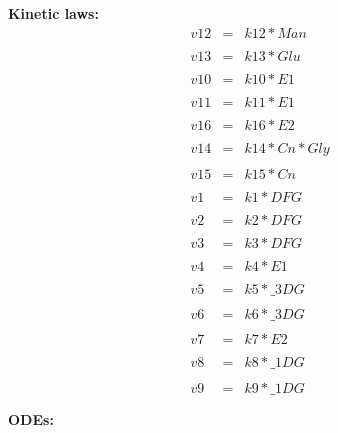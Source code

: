 \textbf{Kinetic laws:}
\tiny
\begin{eqnarray}
v12 & = &  k12*Man \\\nonumber & & \\
v13 & = &  k13*Glu \\\nonumber & & \\
v10 & = &  k10*E1 \\\nonumber & & \\
v11 & = &  k11*E1 \\\nonumber & & \\
v16 & = &  k16*E2 \\\nonumber & & \\
v14 & = &  k14*Cn*Gly \\\nonumber & & \\
v15 & = &  k15*Cn \\\nonumber & & \\
v1 & = &  k1*DFG \\\nonumber & & \\
v2 & = &  k2*DFG \\\nonumber & & \\
v3 & = &  k3*DFG \\\nonumber & & \\
v4 & = &  k4*E1 \\\nonumber & & \\
v5 & = &  k5*\_3DG \\\nonumber & & \\
v6 & = &  k6*\_3DG \\\nonumber & & \\
v7 & = &  k7*E2 \\\nonumber & & \\
v8 & = &  k8*\_1DG \\\nonumber & & \\
v9 & = &  k9*\_1DG \\\nonumber & & \\\nonumber
\end{eqnarray}
\normalsize
\textbf{ODEs:}
\tiny
